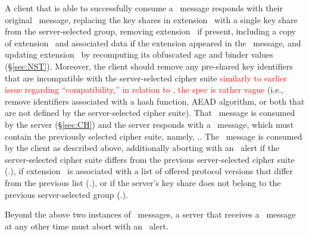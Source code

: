 \fi
A client that is able to successfully consume a \HelloRetryRequest\ message
responds with their original \ClientHello\ message, replacing the key shares 
in extension \TLSkeyShare\ with a single key share from the server-selected group,
removing extension \TLSearlyData\ if present,
including a copy \label{comp:HRR:cons:cookie} of extension \TLScookie\ and 
associated data if the extension appeared in the 
\HelloRetryRequest\ message, and updating extension \TLSpsk\ by recomputing its 
obfuscated age and binder values (\S\ref{sec:NST}).
Moreover, the client should remove any pre-shared
key identifiers that are incompatible with the server-selected cipher suite
\ifSpecNotes
\textcolor{red}{similarly to earlier issue regarding ``compatibility,''
  in relation to \ClientHello, the spec is rather vague}
\fi
(i.e., remove identifiers associated with a hash function, AEAD algorithm, 
  or both that are not defined by the server-selected cipher suite).
That \ClientHello\ message is consumed by the server (\S\ref{sec:CH}) and 
the server responds with a \ServerHello\ message, which must contain the
previously selected cipher suite, namely, \HelloRetryRequest.\TLSCipherSuite.
The \ServerHello\ message is consumed by the client as described above, 
additionally aborting with an \TLSillegalParameter\ alert if the server-selected
cipher suite differs from the previous server-selected cipher suite 
(\HelloRetryRequest.\TLSCipherSuite), if extension \TLSsupportedVersions\
is associated with a list of offered protocol versions that differ from 
the previous list (\HelloRetryRequest.\TLSsupportedVersions), or if the 
server's key share does not belong to the previous server-selected group 
(\HelloRetryRequest.\TLSkeyShare).

Beyond the above two instances of \ClientHello\ messages, a server that 
receives a \ClientHello\ message at any other time must abort with an 
\TLSunexpectedMessage\ alert.


